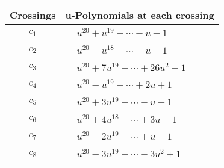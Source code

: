 \documentclass[1p]{elsarticle_modified}
\theoremstyle{definition}
\begin{document}
\begin{tabular}{m{50pt}|m{274pt}}
Crossings & \hspace{64pt}u-Polynomials at each crossing \\
\hline $$\begin{aligned}c_{1}\end{aligned}$$&$\begin{aligned}
&u^{20}+u^{19}+\cdots- u-1
\end{aligned}$\\
\hline $$\begin{aligned}c_{2}\end{aligned}$$&$\begin{aligned}
&u^{20}- u^{18}+\cdots- u-1
\end{aligned}$\\
\hline $$\begin{aligned}c_{3}\end{aligned}$$&$\begin{aligned}
&u^{20}+7 u^{19}+\cdots+26 u^2-1
\end{aligned}$\\
\hline $$\begin{aligned}c_{4}\end{aligned}$$&$\begin{aligned}
&u^{20}- u^{19}+\cdots+2 u+1
\end{aligned}$\\
\hline $$\begin{aligned}c_{5}\end{aligned}$$&$\begin{aligned}
&u^{20}+3 u^{19}+\cdots- u-1
\end{aligned}$\\
\hline $$\begin{aligned}c_{6}\end{aligned}$$&$\begin{aligned}
&u^{20}+4 u^{18}+\cdots+3 u-1
\end{aligned}$\\
\hline $$\begin{aligned}c_{7}\end{aligned}$$&$\begin{aligned}
&u^{20}-2 u^{19}+\cdots+u-1
\end{aligned}$\\
\hline $$\begin{aligned}c_{8}\end{aligned}$$&$\begin{aligned}
&u^{20}-3 u^{19}+\cdots-3 u^2+1
\end{aligned}$\\

\end{tabular}
\end{document}
